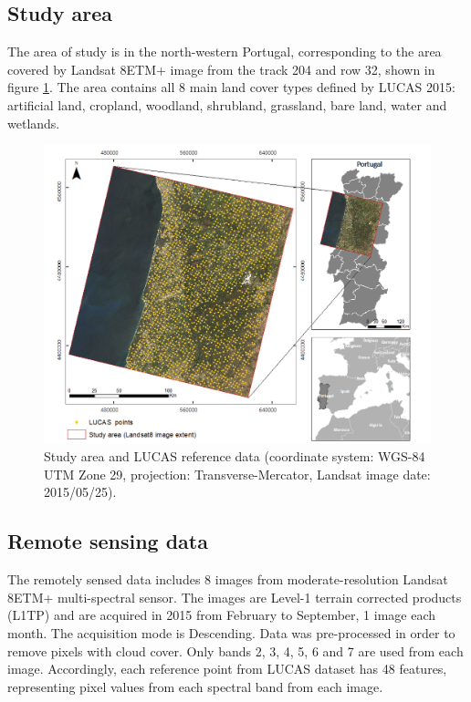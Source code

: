 \documentclass[remotesensing,article,submit,moreauthors,pdftex]{Definitions/mdpi}
\begin{document}
\subsection{Study area}

The area of study is in the north-western Portugal, corresponding to the area
covered by Landsat 8ETM+ image from the track 204 and row 32, shown in figure
\ref{fig:studyarea}. The area contains all 8 main land cover types defined by
LUCAS 2015: artificial land, cropland, woodland, shrubland, grassland, bare 
land, water and wetlands.

\begin{figure}[H]
	\centering
	\includegraphics[width=1\linewidth]{../analysis/study_area}
	\caption{Study area and LUCAS reference data (coordinate system: 
			WGS-84 UTM Zone 29, projection: Transverse-Mercator, Landsat image 
			date: 2015/05/25).}
	\label{fig:studyarea}
\end{figure}

\subsection{Remote sensing data}

The remotely sensed data includes 8 images from moderate-resolution Landsat 
8ETM+ multi-spectral sensor. The images are Level-1 terrain corrected products 
(L1TP) and are acquired in 2015 from February to September, 1 image each month. 
The acquisition mode is Descending.  Data was pre-processed in order to remove 
pixels with cloud cover. Only bands 2, 3, 4, 5, 6 and 7 are used from each 
image. Accordingly, each reference point from LUCAS dataset has 48 features,
representing pixel values from each spectral band from each image.
\end{document}
